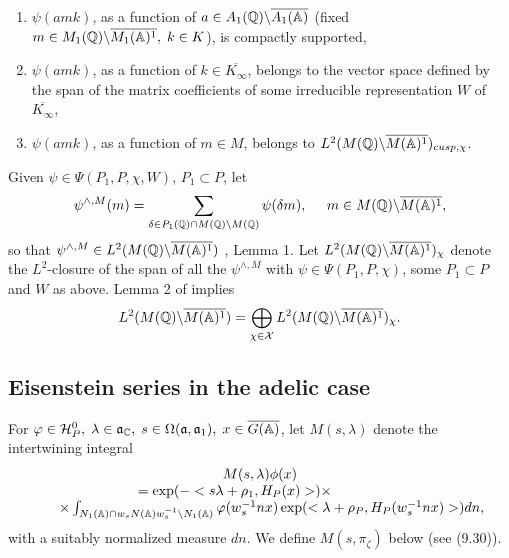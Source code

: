 \begin{enumerate}
\item  $\psi (amk)$, as a function of 
$a\in A_1({\Bbb{Q}})\backslash \overline{A_1({\Bbb{A}})}$ (fixed 
$m\in M_1({\Bbb{Q}})\backslash \overline{M_1({\Bbb{A}})^1},\;k\in K$),
is compactly supported,

\item  $\psi (amk)$, as a function of $k\in \overline{K_\infty}$,
belongs to the
vector space defined by the span of the matrix coefficients of some
irreducible representation $W$ of $\overline{K_\infty}$,

\item  $\psi (amk)$, as a function of $m\in M$, belongs to 
$L^2(M({{\Bbb{Q}}})\backslash \overline{M({\Bbb{A}})^1})_{cusp,\chi }$.
\end{enumerate}

Given $\psi \in \Psi (P_1,P,\chi,W )$, $P_1\subset P$, let 
\[
\psi ^{\wedge ,M}(m)=
\sum_{\delta \in P_1({\Bbb{Q}})\cap
M({\Bbb{Q}})\backslash M({\Bbb{Q}})}
\psi (\delta m),\;\;\;\;\;
m\in M({\Bbb{Q}})\backslash \overline{M({\Bbb{A}})^1}, 
\]
so that
$\psi ^{\wedge ,M}\in
L^2(M({\Bbb{Q}})\backslash \overline{M({\Bbb{A}})^1})$
\cite{L1}, Lemma 1. Let
$L^2(M({\Bbb{Q}})\backslash \overline{M({\Bbb{A}})^1})_\chi $ denote
the $L^2$-closure of the span of all the
$\psi ^{\wedge ,M}$ with $\psi \in \Psi (P_1,P,\chi )$,
some $P_1\subset P$ and $W$ as above. Lemma 2 of \cite{L1} implies 
\begin{equation}
L^2(M({\Bbb{Q}})\backslash \overline{M({\Bbb{A}})^1})
=\bigoplus_{\chi \in {\cal X}}
L^2(M({\Bbb{Q}})\backslash \overline{M({\Bbb{A}})^1})_\chi .
\end{equation}

\subsection{Eisenstein series in the adelic case}

For $\varphi \in {\cal H}_P^0,\;\lambda \in {\frak{a}}_{{\Bbb C}},\;s\in
\Omega ({\frak{a}},{\frak{a}}_1),\;x\in \overline{G({\Bbb{A}})}$, let
$M(s,\lambda)$ denote the intertwining integral
\begin{equation}
\begin{array}{c}
M(s,\lambda )\phi(x) \\ 
=\exp (-<s\lambda +\rho _1,H_P(x)>)\times \;\;\;\;\;\;\;\;\;\;\;\;\; \\ 
\;\;\;\;\;\;\times
\int_{N_1({\Bbb{A}})\cap w_sN({\Bbb{A}})w_s^{-1}\backslash
N_1({\Bbb{A}})}\varphi (w_s^{-1}nx)
\exp (<\lambda +\rho_P,H_P(w_s^{-1}nx)>)dn,
\end{array}
\end{equation}
with a suitably normalized measure $dn$.
We define $M(s,\pi_\zeta)$ below (see (9.30)).

